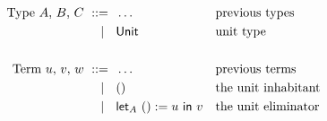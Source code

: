 \begin{align*}
  \text{Type $A$, $B$, $C$}
    \ \mathrel{{:}{:}{=}}\    {}& \ldots                   && \text{previous types}\\
    \ \mid\ \  {}& \mathsf{Unit}                    && \text{unit type} \\
  \\
  \text{Term $u$, $v$, $w$}
    \ \mathrel{{:}{:}{=}}\    {}& \ldots                   && \text{previous terms} \\
    \ \mid\ \  {}& \mathsf{()}                    && \text{the unit inhabitant} \\
    \ \mid\ \  {}& \mathsf{let}_{A}\ \mathsf{()} := u\ \mathsf{in}\  v       && \text{the unit eliminator}
\end{align*}

\newcommand{\rlTyUnit}{\referTo{ty-unit}{rul:ty-unit}}
\newcommand{\showTyUnit}{%
  \infer[\rulename{ty-unit}] %
  {\isctx{\G}}
  {\istype{\G}{\Unit}}
}

\newcommand{\rlTermUnit}{\referTo{term-unit}{rul:term-unit}}
\newcommand{\showTermUnit}{%
  \infer[\rulename{term-unit}] %
  {\isctx{\G}}
  {\isterm{\G}{\unit}{\Unit}}
}

\newcommand{\rlTermLet}{\referTo{term-let}{rul:term-let}}
\newcommand{\showTermLet}{%
  \infer[\rulename{term-let}] %
  {\istype{\ctxextend{\G}{\Unit}}{\A} \\
   \isterm{\G}{\uu}{\Unit} \\
   \isterm{\G}{\vv}{\subst{\A}{\sbzero{\G}{\Unit}{\unit}}}}
  {\isterm{\G}{\ulet{\A}{\uu} \vv}{\subst{\A}{\sbzero{\G}{\Unit}{\uu}}}}
}

\newcommand{\rlEqTySubstUnit}{\referTo{eq-ty-subst-unit}{rul:eq-ty-subst-unit}}
\newcommand{\showEqTySubstUnit}{%
  \infer[\rulename{eq-ty-subst-unit}] %
  {\issubst{\sbs}{\G}{\D}}
  {\eqtype{\G}{\subst{\Unit}{\sbs}}{\Unit}}
}

\newcommand{\rlEqSubstUnit}{\referTo{eq-subst-unit}{rul:eq-subst-unit}}
\newcommand{\showEqSubstUnit}{%
  \infer[\rulename{eq-subst-unit}] %
  {\issubst{\sbs}{\G}{\D}}
  {\eqterm{\G}{\subst{\unit}{\sbs}}{\unit}{\Unit}}
}

\newcommand{\rlEqSubstLet}{\referTo{eq-subst-let}{rul:eq-subst-let}}
\newcommand{\showEqSubstLet}{%
  \infer[\rulename{eq-subst-let}] %
  {\issubst{\sbs}{\G}{\D} \\
   \istype{\ctxextend{\D}{\Unit}}{\A} \\
   \isterm{\D}{\uu}{\Unit} \\
   \isterm{\D}{\vv}{\subst{\A}{\sbzero{\D}{\Unit}{\unit}}}}
  {\eqterm{\G}
    {\subst{(\ulet{\A}{\uu} \vv)}{\sbs}}
    {\ulet
      {\subst{\A}{\sbshift{\G}{\Unit}{\sbs}}}
      {\subst{\uu}{\sbs}}
      \subst{\vv}{\sbs}
    }
    {\subst{\subst{\A}{\sbzero{\D}{\Unit}{\uu}}}}{\sbs}}
}

